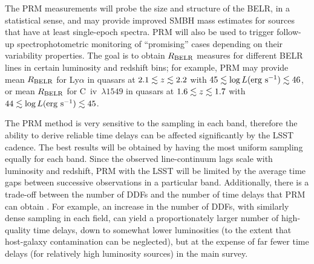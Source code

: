 The PRM measurements will probe the size and structure of the BELR,
in a statistical sense, and may provide improved SMBH mass estimates
for sources that have at least single-epoch spectra. PRM will also be
used to trigger follow-up spectrophotometric monitoring of ``promising''
cases depending on their variability properties. The goal is to obtain
$R_{\rm BELR}$ measures for different BELR lines in certain luminosity
and redshift bins; for example, PRM may provide mean $R_{\rm BELR}$ for
Ly$\alpha$ in quasars at $2.1\lesssim z \lesssim 2.2$ with
$45 \lesssim \log L ({\rm erg~s}^{-1}) \lesssim 46$, or mean $R_{\rm BELR}$
for C~{\sc iv}~$\lambda 1549$ in quasars at $1.6\lesssim z \lesssim 1.7$
with $44 \lesssim \log L ({\rm erg~s}^{-1}) \lesssim 45$.

The PRM method is very sensitive to the sampling in each band,
therefore the ability to derive reliable time delays can be affected
significantly by the LSST cadence. The best results will be obtained
by having the most uniform sampling equally for each band.
%
Since the observed line-continuum lags scale with luminosity and redshift,
PRM with the LSST will be limited by the average time gaps between successive
observations in a particular band.
%
Additionally, there is a trade-off between the number of DDFs and the
number of time delays that PRM can obtain \citep{CheloucheEtal2014}.
For example, an increase in the number of DDFs, with similarly dense
sampling in each field, can yield a proportionately larger number of
high-quality time delays, down to somewhat lower luminosities (to the
extent that host-galaxy contamination can be neglected), but at the
expense of far fewer time delays (for relatively high luminosity
sources) in the main survey.


